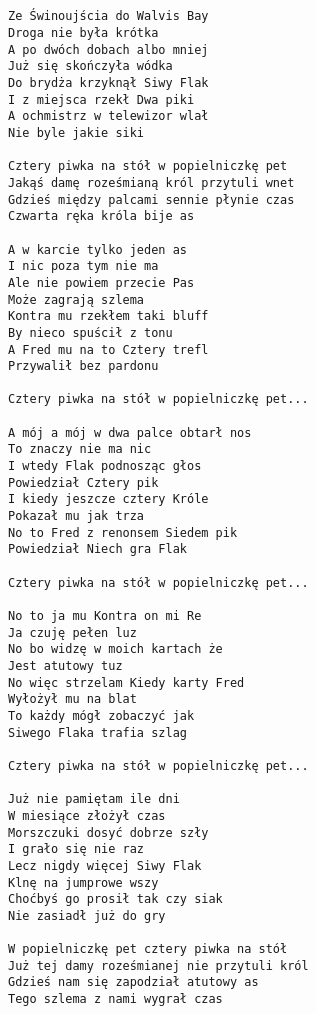 \documentclass[12pt]{article}
\begin{document}
\subsection*{}
\begin{verbatim}
Ze Świnoujścia do Walvis Bay
Droga nie była krótka
A po dwóch dobach albo mniej
Już się skończyła wódka
Do brydża krzyknął Siwy Flak
I z miejsca rzekł Dwa piki
A ochmistrz w telewizor wlał
Nie byle jakie siki

Cztery piwka na stół w popielniczkę pet
Jakąś damę roześmianą król przytuli wnet
Gdzieś między palcami sennie płynie czas
Czwarta ręka króla bije as

A w karcie tylko jeden as
I nic poza tym nie ma
Ale nie powiem przecie Pas
Może zagrają szlema
Kontra mu rzekłem taki bluff
By nieco spuścił z tonu
A Fred mu na to Cztery trefl
Przywalił bez pardonu

Cztery piwka na stół w popielniczkę pet...

A mój a mój w dwa palce obtarł nos
To znaczy nie ma nic
I wtedy Flak podnosząc głos
Powiedział Cztery pik
I kiedy jeszcze cztery Króle
Pokazał mu jak trza
No to Fred z renonsem Siedem pik
Powiedział Niech gra Flak

Cztery piwka na stół w popielniczkę pet...

No to ja mu Kontra on mi Re
Ja czuję pełen luz
No bo widzę w moich kartach że
Jest atutowy tuz
No więc strzelam Kiedy karty Fred
Wyłożył mu na blat
To każdy mógł zobaczyć jak
Siwego Flaka trafia szlag

Cztery piwka na stół w popielniczkę pet...

Już nie pamiętam ile dni
W miesiące złożył czas
Morszczuki dosyć dobrze szły
I grało się nie raz
Lecz nigdy więcej Siwy Flak
Klnę na jumprowe wszy
Choćbyś go prosił tak czy siak
Nie zasiadł już do gry

W popielniczkę pet cztery piwka na stół
Już tej damy roześmianej nie przytuli król
Gdzieś nam się zapodział atutowy as
Tego szlema z nami wygrał czas
\end{verbatim}
\clearpage
\end{document}
